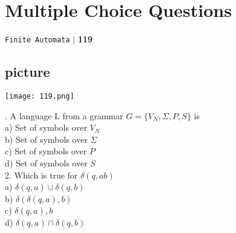 \documentclass[a4,9pt]{beamer}
\begin{document}
\begin{frame}
\section*{Multiple Choice Questions}
\begin{flushright}
 \texttt{Finite Automata} \hspace*{0.1cm}\textbf{$|$} \hspace*{0.1cm} \textbf{119}\hspace*{0.1cm}
\end{flushright}

\begin{center}
\section{picture}
\texttt{[image: 119.png]}
\end{center}

. A language L from a grammar $G = \{V_N, \Sigma,P, S\}$ is\\
\hspace*{0.5cm} a) Set of symbols over $V_N$ \\
\hspace*{0.5cm} b) Set of symbols over $\Sigma$ \\
\hspace*{0.5cm} c) Set of symbols over $P$ \\
\hspace*{0.5cm} d) Set of symbols over $S$ \\

\pause
\vspace*{0.2cm}
2. Which is true for $\delta(q, ab)$ \\
\hspace*{0.5cm} a) $\delta(q, a) \cup \delta(q, b)$ \\
\hspace*{0.5cm} b) $\delta(\delta(q, a), b)$ \\
\hspace*{0.5cm} c) $\delta(q, a), b$ \\
\hspace*{0.5cm} d) $\delta(q, a) \cap \delta(q, b)$ \\

\vspace*{0.2cm}
\end{frame}
\end{document}
